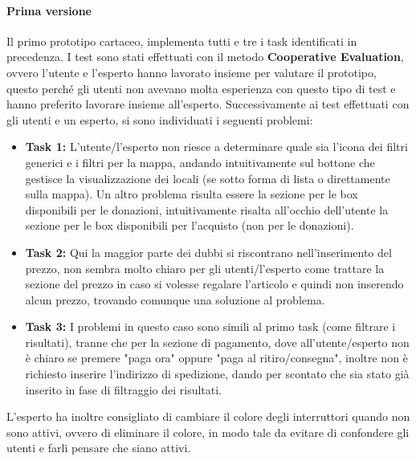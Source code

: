 \documentclass{article}
\begin{document}
\paragraph{Prima versione}
\mbox{}
\newline
Il primo prototipo cartaceo, implementa tutti e tre i task identificati in precedenza.
I test sono stati effettuati con il metodo \textbf{Cooperative Evaluation}, ovvero l'utente e l'esperto hanno lavorato insieme per valutare il prototipo, questo perché gli utenti non avevano molta esperienza con questo tipo di test e hanno preferito lavorare insieme all'esperto.
Successivamente ai test effettuati con gli utenti e un esperto, si sono individuati i seguenti problemi:
\begin{itemize}
    \item \textbf{Task 1:} L'utente/l'esperto non riesce a determinare quale sia l'icona dei filtri generici e i filtri per la mappa, andando intuitivamente sul bottone che gestisce la visualizzazione dei locali (se sotto forma di lista o direttamente sulla mappa). Un altro problema risulta essere la sezione per le box disponibili per le donazioni, intuitivamente risalta all'occhio dell'utente la sezione per le box disponibili per l'acquisto (non per le donazioni).
    \item \textbf{Task 2:} Qui la maggior parte dei dubbi si riscontrano nell'inserimento del prezzo, non sembra molto chiaro per gli utenti/l'esperto come trattare la sezione del prezzo in caso si volesse regalare l'articolo e quindi non inserendo alcun prezzo, trovando comunque una soluzione al problema.
    \item \textbf{Task 3:} I problemi in questo caso sono simili al primo task (come filtrare i risultati), tranne che per la sezione di pagamento, dove all'utente/esperto non è chiaro se premere "paga ora" oppure "paga al ritiro/consegna", inoltre non è richiesto inserire l'indirizzo di spedizione, dando per scontato che sia stato già inserito in fase di filtraggio dei risultati.
\end{itemize}
L'esperto ha inoltre consigliato di cambiare il colore degli interruttori quando non sono attivi, ovvero di eliminare il colore, in modo tale da evitare di confondere gli utenti e farli pensare che siano attivi.
\end{document}
